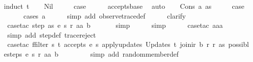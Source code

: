 \begin{isabellebody}
%
\isadelimproof
%
\endisadelimproof
%
\isatagproof
{}\isamarkupfalse%
{\isacharparenleft}induct\ t{\isacharparenright}\isanewline
\ \ \isamarkupfalse%
\ Nil\isanewline
\ \ \isamarkupfalse%
\ \isamarkupfalse%
\ {\isacharquery}case\isanewline
\ \ \ \ \isamarkupfalse%
\ accepts{\isachardot}base\ \isamarkupfalse%
\ auto\isanewline
{}\isamarkupfalse%
\isanewline
\ \ \isamarkupfalse%
\ {\isacharparenleft}Cons\ a\ as{\isacharparenright}\isanewline
\ \ \isamarkupfalse%
\ \isamarkupfalse%
\ {\isacharquery}case\isanewline
\ \ \ \ \isamarkupfalse%
\ {\isacharparenleft}cases\ a{\isacharparenright}\isanewline
\ \ \ \ \isamarkupfalse%
\ {\isacharparenleft}simp\ add{\isacharcolon}\ observe{\isacharunderscore}trace{\isacharunderscore}def{\isacharparenright}\isanewline
\ \ \ \ \isamarkupfalse%
\ clarify\isanewline
\ \ \ \ \isamarkupfalse%
\ {\isacharparenleft}case{\isacharunderscore}tac\ {\isachardoublequoteopen}step\ as\ e\ s\ r\ aa\ b{\isachardoublequoteclose}{\isacharparenright}\isanewline
\ \ \ \ \ \isamarkupfalse%
\ simp\isanewline
\ \ \ \ \isamarkupfalse%
\ simp\isanewline
\ \ \ \ \isamarkupfalse%
\ {\isacharparenleft}case{\isacharunderscore}tac\ aaa{\isacharparenright}\isanewline
\ \ \ \ \isamarkupfalse%
\ {\isacharparenleft}simp\ add{\isacharcolon}\ step{\isacharunderscore}def\ trace{\isacharunderscore}reject{\isacharunderscore}{}{\isacharparenright}\isanewline
\ \ \ \ \isamarkupfalse%
\ {\isacharparenleft}case{\isacharunderscore}tac\ {\isachardoublequoteopen}{\isacharparenleft}ffilter\ {\isacharparenleft}{\isasymlambda}{\isacharparenleft}s{\isacharprime}{\isacharcomma}\ t{\isacharparenright}{\isachardot}\ accepts\ e\ s{\isacharprime}\ {\isacharparenleft}apply{\isacharunderscore}updates\ {\isacharparenleft}Updates\ t{\isacharparenright}\ {\isacharparenleft}join{\isacharunderscore}ir\ b\ r{\isacharparenright}\ r{\isacharparenright}\ as{\isacharparenright}\ {\isacharparenleft}possible{\isacharunderscore}steps\ e\ s\ r\ aa\ b{\isacharparenright}{\isacharparenright}\ {\isacharequal}\ {\isacharbraceleft}{\isacharbar}{\isacharbar}{\isacharbraceright}{\isachardoublequoteclose}{\isacharparenright}\isanewline
\ \ \ \ \ \isamarkupfalse%
\ {\isacharparenleft}simp\ add{\isacharcolon}\ random{\isacharunderscore}member{\isacharunderscore}def{\isacharparenright}\isanewline

\end{isabellebody}

